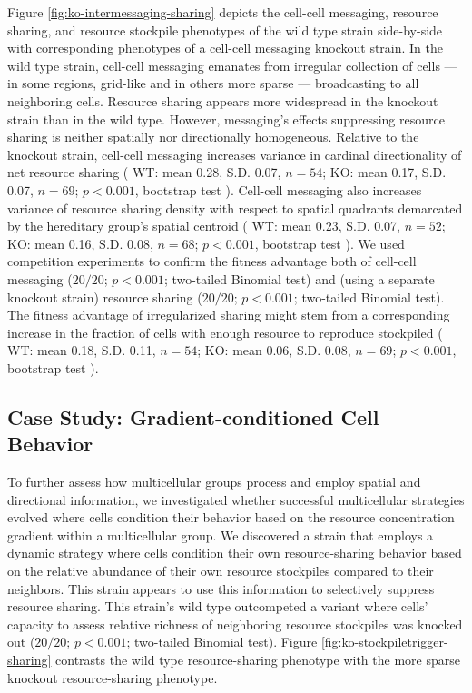 Figure \ref{fig:ko-intermessaging-sharing} depicts the cell-cell messaging, resource sharing, and resource stockpile phenotypes of the wild type strain side-by-side with corresponding phenotypes of a cell-cell messaging knockout strain.
In the wild type strain, cell-cell messaging emanates from irregular collection of cells --- in some regions, grid-like and in others more sparse --- broadcasting to all neighboring cells.
Resource sharing appears more widespread in the knockout strain than in the wild type.
However, messaging's effects suppressing resource sharing is neither spatially nor directionally homogeneous.
Relative to the knockout strain, cell-cell messaging increases variance in cardinal directionality of net resource sharing
(%
WT: mean 0.28, S.D. 0.07, $n=54$; %
KO: mean 0.17, S.D. 0.07, $n=69$; %
$p < 0.001$, bootstrap test%
).
Cell-cell messaging also increases variance of resource sharing density with respect to spatial quadrants demarcated by the hereditary group's spatial centroid
(%
WT: mean 0.23, S.D. 0.07, $n=52$; %
KO: mean 0.16, S.D. 0.08, $n=68$; %
$p < 0.001$, bootstrap test%
).
We used competition experiments to confirm the fitness advantage both of cell-cell messaging ($20/20$; $p < 0.001$; two-tailed Binomial test) and (using a separate knockout strain) resource sharing ($20/20$; $p < 0.001$; two-tailed Binomial test).
The fitness advantage of irregularized sharing might stem from a corresponding increase in the fraction of cells with enough resource to reproduce stockpiled
(%
WT: mean 0.18, S.D. 0.11, $n=54$; %
KO: mean 0.06, S.D. 0.08, $n=69$; %
$p < 0.001$, bootstrap test%
).

\subsection{Case Study: Gradient-conditioned Cell Behavior} \label{sec:gradient-conditioned-behavior}



To further assess how multicellular groups process and employ spatial and directional information, we investigated whether successful multicellular strategies evolved where cells condition their behavior based on the resource concentration gradient within a multicellular group.
We discovered a strain that employs a dynamic strategy where cells condition their own resource-sharing behavior based on the relative abundance of their own resource stockpiles compared to their neighbors.
This strain appears to use this information to selectively suppress resource sharing.
This strain's wild type outcompeted a variant where cells' capacity to assess relative richness of neighboring resource stockpiles was knocked out ($20/20$; $p < 0.001$; two-tailed Binomial test).
Figure \ref{fig:ko-stockpiletrigger-sharing} contrasts the wild type resource-sharing phenotype with the more sparse knockout resource-sharing phenotype.

